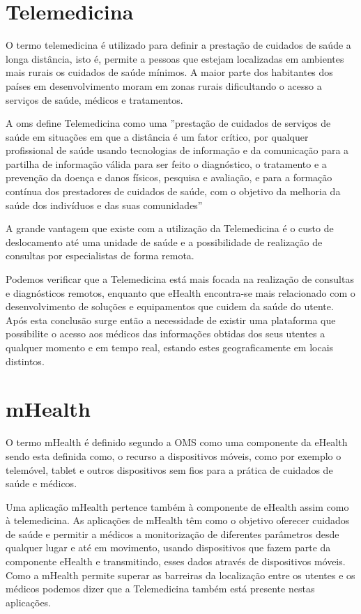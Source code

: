 \documentclass[11pt,twoside,a4paper]{report}
\begin{document}
\section{Telemedicina}

O termo telemedicina \'e utilizado para definir a presta\c c\~ao de cuidados de sa\'ude a longa dist\^ancia, isto \'e, permite a pessoas que estejam localizadas em ambientes mais rurais os cuidados de sa\'ude m\'inimos. A maior parte dos habitantes dos pa\'ises em desenvolvimento moram em zonas rurais dificultando o acesso a servi\c cos de sa\'ude, m\'edicos e tratamentos.

A \gls{oms} define Telemedicina como \cite{ehealth_telemedicine} uma ''presta\c c\~ao de cuidados de servi\c cos de sa\'ude em situa\c c\~oes em que a dist\^ancia \'e um fator cr\'itico, por qualquer profissional de sa\'ude usando tecnologias de informa\c c\~ao e da comunica\c c\~ao para a partilha de informa\c c\~ao v\'alida para ser feito o diagn\'ostico, o tratamento e a preven\c c\~ao da doen\c ca e danos f\'isicos, pesquisa e avalia\c c\~ao, e para a forma\c c\~ao cont\'inua dos prestadores de cuidados de sa\'ude, com o objetivo da melhoria da sa\'ude dos indiv\'iduos e das suas comunidades''
\par
A grande vantagem que existe com a utiliza\c c\~ao da Telemedicina \'e o custo de deslocamento at\'e uma unidade de sa\'ude e a possibilidade de realiza\c c\~ao de consultas por especialistas de forma remota.
\par
Podemos verificar que a Telemedicina est\'a mais focada na realiza\c c\~ao de consultas e diagn\'osticos remotos, enquanto que eHealth encontra-se mais relacionado com o desenvolvimento de solu\c c\~oes e equipamentos que cuidem da sa\'ude do utente. Ap\'os esta conclus\~ao surge ent\~ao a necessidade de existir uma plataforma que possibilite o acesso aos m\'edicos das informa\c c\~oes obtidas dos seus utentes a qualquer momento e em tempo real, estando estes geograficamente em locais distintos.

\section{mHealth}

O termo \gls{mHealth} \'e definido segundo a OMS como uma componente da eHealth \cite{mhealth_oms} sendo esta definida como, o recurso a dispositivos m\'oveis, como por exemplo o telem\'ovel, tablet e outros dispositivos sem fios para a pr\'atica de cuidados de sa\'ude e m\'edicos.
\par
Uma aplica\c c\~ao mHealth pertence tamb\'em \`a componente de eHealth assim como \`a telemedicina. As aplica\c c\~oes de mHealth t\^em como o objetivo oferecer cuidados de sa\'ude e permitir a m\'edicos a monitoriza\c c\~ao de diferentes par\^ametros desde qualquer lugar e at\'e em movimento, usando dispositivos que fazem parte da componente eHealth e transmitindo, esses dados atrav\'es de dispositivos m\'oveis. 
Como a mHealth permite superar as barreiras da localiza\c c\~ao entre os utentes e os m\'edicos podemos dizer que a Telemedicina tamb\'em est\'a presente nestas aplica\c c\~oes.
\end{document}
